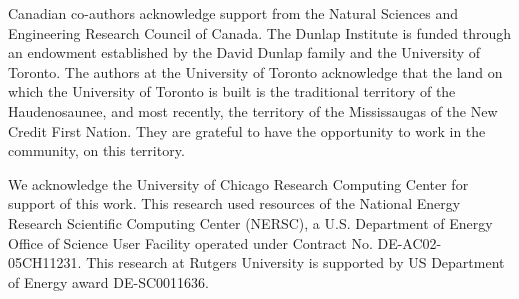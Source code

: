 \documentclass[\docopts]{\docclass}
\begin{document}
Canadian co-authors acknowledge support from the Natural Sciences and Engineering Research Council of Canada.
The Dunlap Institute is funded through an endowment established by the David Dunlap family and the University of Toronto.
The authors at the University of Toronto acknowledge that the land on which the University of Toronto is built is the traditional territory of the Haudenosaunee, and most recently, the territory of the Mississaugas of the New Credit First Nation.
They are grateful to have the opportunity to work in the community, on this territory.

We acknowledge the University of Chicago Research Computing Center for support of this work.
This research used resources of the National Energy Research Scientific Computing Center (NERSC), a U.S. Department of Energy Office of Science User Facility operated under Contract No. DE-AC02-05CH11231.
This research at Rutgers University is supported by US Department of Energy award DE-SC0011636.



%
%




\end{document}
